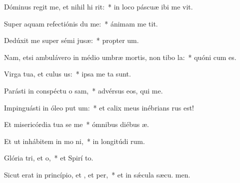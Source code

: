 \item Dóminus regit me, et nihil hi rit:~* in loco páscuæ ibi me vit.
\item Super aquam refectiónis du me:~* ánimam me tit.
\item Dedúxit me super sémi jusæ:~* propter  um.
\item Nam, etsi ambulávero in médio umbræ mortis, non tibo la:~* quóni  cum es.
\item Virga tua, et culus us:~* ipsa me ta sunt.
\item Parásti in conspéctu o sam,~* advérsus eos, qui  me.
\item Impinguásti in óleo put um:~* et calix meus inébrians  rus est!
\item Et misericórdia tua se me~* ómnibus diébus  æ.
\item Et ut inhábitem in mo ni,~* in longitúdi rum.
\item Glória tri, et o,~* et Spirí to.
\item Sicut erat in princípio, et , et per,~* et in sǽcula sæcu. men.
